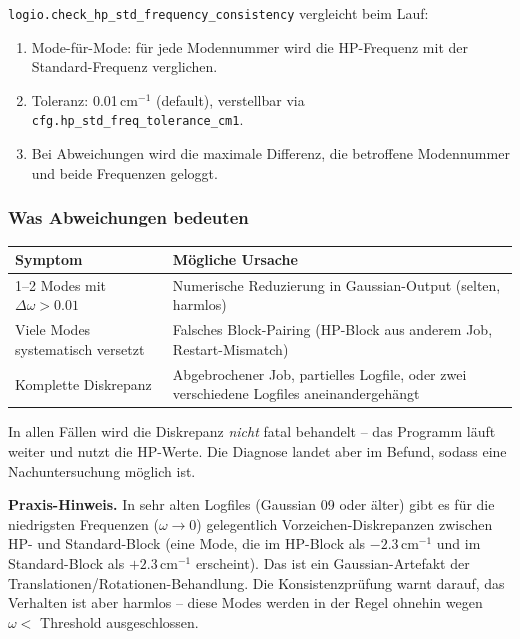 \documentclass[11pt,a4paper,twoside]{article}
\theoremstyle{remark}
\begin{document}
\texttt{logio.check\_hp\_std\_frequency\_consistency} vergleicht beim
Lauf:

\begin{enumerate}
  \item Mode-f\"ur-Mode: f\"ur jede Modennummer wird die HP-Frequenz
        mit der Standard-Frequenz verglichen.
  \item Toleranz: 0.01\,cm$^{-1}$ (default), verstellbar via
        \texttt{cfg.hp\_std\_freq\_tolerance\_cm1}.
  \item Bei Abweichungen wird die maximale Differenz, die betroffene
        Modennummer und beide Frequenzen geloggt.
\end{enumerate}

\subsubsection*{Was Abweichungen bedeuten}

\begin{center}
\begin{tabularx}{\textwidth}{l X}
\toprule
\textbf{Symptom} & \textbf{M\"ogliche Ursache} \\
\midrule
1--2 Modes mit $\Delta\omega > 0.01$ &
  Numerische Reduzierung in Gaussian-Output (selten, harmlos) \\
Viele Modes systematisch versetzt &
  Falsches Block-Pairing (HP-Block aus anderem Job, Restart-Mismatch) \\
Komplette Diskrepanz &
  Abgebrochener Job, partielles Logfile, oder zwei verschiedene
  Logfiles aneinandergeh\"angt \\
\bottomrule
\end{tabularx}
\end{center}

In allen F\"allen wird die Diskrepanz \emph{nicht} fatal behandelt --
das Programm l\"auft weiter und nutzt die HP-Werte. Die Diagnose
landet aber im Befund, sodass eine Nachuntersuchung m\"oglich ist.

\begin{warnbox}
\textbf{Praxis-Hinweis.} In sehr alten Logfiles (Gaussian 09 oder
\"alter) gibt es f\"ur die niedrigsten Frequenzen ($\omega \to 0$)
gelegentlich Vorzeichen-Diskrepanzen zwischen HP- und Standard-Block
(eine Mode, die im HP-Block als $-2.3$\,cm$^{-1}$ und im Standard-Block
als $+2.3$\,cm$^{-1}$ erscheint). Das ist ein Gaussian-Artefakt der
Translationen/Rotationen-Behandlung. Die Konsistenzpr\"ufung warnt
darauf, das Verhalten ist aber harmlos -- diese Modes werden in der
Regel ohnehin wegen $\omega < $ Threshold ausgeschlossen.
\end{warnbox}
\end{document}
